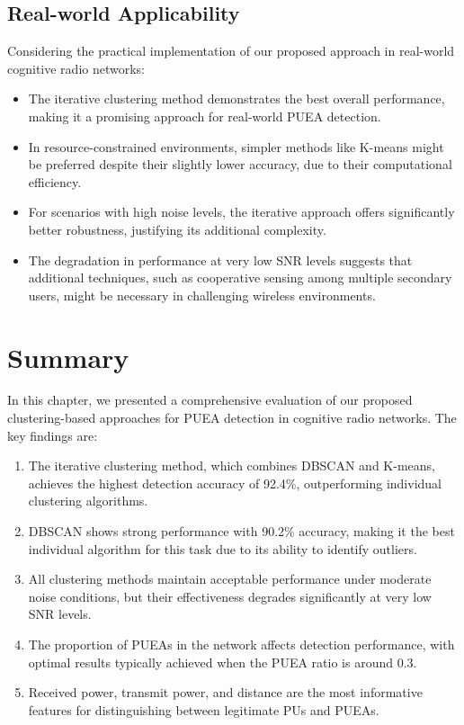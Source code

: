 \subsection{Real-world Applicability}
Considering the practical implementation of our proposed approach in real-world cognitive radio networks:

\begin{itemize}
    \item The iterative clustering method demonstrates the best overall performance, making it a promising approach for real-world PUEA detection.
    
    \item In resource-constrained environments, simpler methods like K-means might be preferred despite their slightly lower accuracy, due to their computational efficiency.
    
    \item For scenarios with high noise levels, the iterative approach offers significantly better robustness, justifying its additional complexity.
    
    \item The degradation in performance at very low SNR levels suggests that additional techniques, such as cooperative sensing among multiple secondary users, might be necessary in challenging wireless environments.
\end{itemize}

\section{Summary}
In this chapter, we presented a comprehensive evaluation of our proposed clustering-based approaches for PUEA detection in cognitive radio networks. The key findings are:

\begin{enumerate}
    \item The iterative clustering method, which combines DBSCAN and K-means, achieves the highest detection accuracy of 92.4\%, outperforming individual clustering algorithms.
    
    \item DBSCAN shows strong performance with 90.2\% accuracy, making it the best individual algorithm for this task due to its ability to identify outliers.
    
    \item All clustering methods maintain acceptable performance under moderate noise conditions, but their effectiveness degrades significantly at very low SNR levels.
    
    \item The proportion of PUEAs in the network affects detection performance, with optimal results typically achieved when the PUEA ratio is around 0.3.
    
    \item Received power, transmit power, and distance are the most informative features for distinguishing between legitimate PUs and PUEAs.
\end{enumerate}

